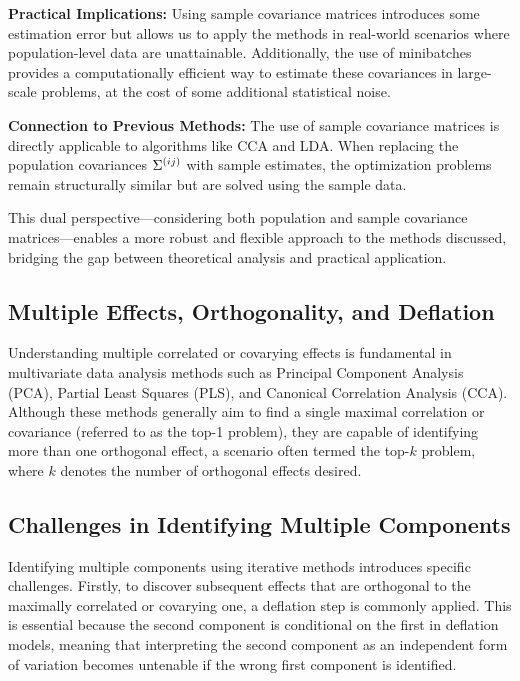 \textbf{Practical Implications:} Using sample covariance matrices introduces some estimation error but allows us to apply the methods in real-world scenarios where population-level data are unattainable. Additionally, the use of minibatches provides a computationally efficient way to estimate these covariances in large-scale problems, at the cost of some additional statistical noise.

\textbf{Connection to Previous Methods:} The use of sample covariance matrices is directly applicable to algorithms like CCA and LDA. When replacing the population covariances \(\Sigma^{(ij)}\) with sample estimates, the optimization problems remain structurally similar but are solved using the sample data.

This dual perspective—considering both population and sample covariance matrices—enables a more robust and flexible approach to the methods discussed, bridging the gap between theoretical analysis and practical application.

\subsection{Multiple Effects, Orthogonality, and Deflation}\label{subsec:orthogonality}

Understanding multiple correlated or covarying effects is fundamental in multivariate data analysis methods such as Principal Component Analysis (PCA), Partial Least Squares (PLS), and Canonical Correlation Analysis (CCA). Although these methods generally aim to find a single maximal correlation or covariance (referred to as the top-1 problem), they are capable of identifying more than one orthogonal effect, a scenario often termed the top-$k$ problem, where $k$ denotes the number of orthogonal effects desired.

\subsection{Challenges in Identifying Multiple Components}

Identifying multiple components using iterative methods introduces specific challenges.
Firstly, to discover subsequent effects that are orthogonal to the maximally correlated or covarying one, a deflation step is commonly applied.
This is essential because the second component is conditional on the first in deflation models, meaning that interpreting the second component as an independent form of variation becomes untenable if the wrong first component is identified.

